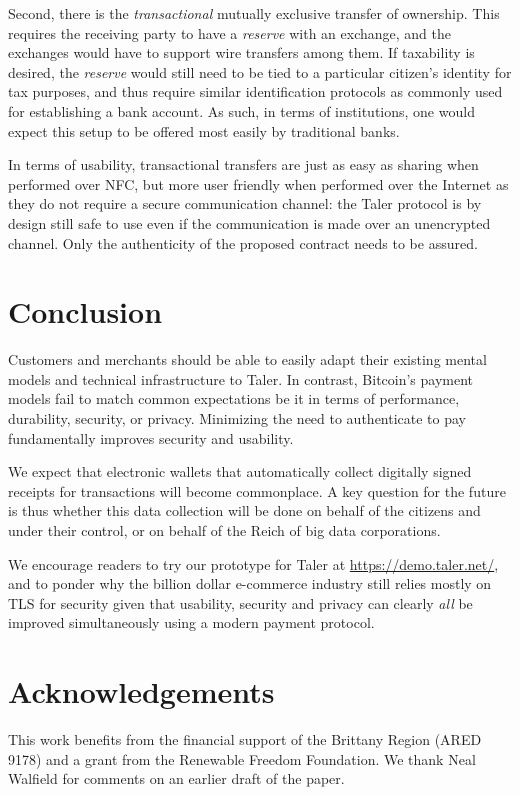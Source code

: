 \documentclass{llncs}
\begin{document}
Second, there is the {\em transactional} mutually exclusive transfer
of ownership.  This requires the receiving party to have a {\em
reserve} with an exchange, and the exchanges would have to support
wire transfers among them.  If taxability is desired, the {\em
reserve} would still need to be tied to a particular citizen's
identity for tax purposes, and thus require similar identification
protocols as commonly used for establishing a bank account.  As such, in
terms of institutions, one would expect this setup to be offered most
easily by traditional banks.

In terms of usability, transactional
transfers are just as easy as sharing when performed over NFC, but
more user friendly when performed over the Internet as they do not
require a secure communication channel: the Taler protocol is by
design still safe to use even if the communication is made over an
unencrypted channel. Only the authenticity of the proposed contract
needs to be assured.



\section{Conclusion}

Customers and merchants should be able to easily adapt their existing
mental models and technical infrastructure to Taler.  In contrast,
Bitcoin's payment models fail to match common expectations be it in
terms of performance, durability, security, or privacy.  Minimizing
the need to authenticate to pay fundamentally improves security
and usability.

We expect that electronic wallets that automatically collect digitally
signed receipts for transactions will become commonplace.  A key
question for the future is thus whether this data collection will be
done on behalf of the citizens and under their control, or on behalf
of the Reich of big data corporations.

We encourage readers to try our prototype for Taler
at \url{https://demo.taler.net/}, and to ponder why the billion dollar
e-commerce industry still relies mostly on TLS for security given
that usability, security and privacy can clearly {\em all} be improved
simultaneously using a modern payment protocol.


\section*{Acknowledgements}

This work benefits from the financial support of the Brittany Region
(ARED 9178) and a grant from the Renewable Freedom Foundation.  We
thank Neal Walfield for comments on an earlier draft of the paper.



\end{document}
